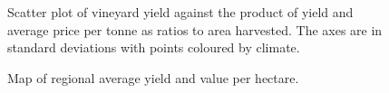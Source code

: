 \documentclass[review,12pt,authoryear]{elsarticle}
\begin{document}
\begin{linenumbers}
\begin{figure}
    \caption{Scatter plot of vineyard yield against the product of yield and average price per tonne as ratios to area harvested. The axes are in standard deviations with points coloured by climate.}
\end{figure}
%
\begin{figure}\label{fig:map}
  \caption{Map of regional average yield and value per hectare.}
\end{figure}
%


\end{linenumbers}
\end{document}
